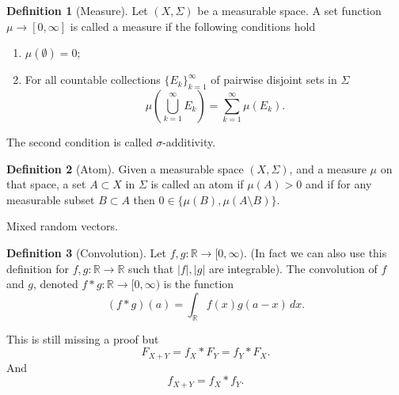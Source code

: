 \documentclass[11pt,a4paper]{article}
\theoremstyle{definition}
\newtheorem{definition}{Definition}[section]
\theoremstyle{plain}
\newcommand{\R}{\mathbb{R}}
\newcommand{\abs}[1]{\left\lvert #1\right\rvert}
\begin{document}
  \begin{definition}[Measure]
    Let $(X, \Sigma)$ be a measurable space.
    A set function $\mu \to [0,\infty]$ is called a measure if the following
    conditions hold
    \begin{enumerate}
      \item $\mu(\emptyset) = 0$;
      \item For all countable collections $\{E_{k}\}_{k=1}^{\infty }$ of
            pairwise disjoint sets in $\Sigma$
            \[ \mu \left(\bigcup _{k=1}^{\infty }E_{k}\right) =
               \sum _{k=1}^{\infty }\mu (E_{k}). \]
    \end{enumerate}
    The second condition is called $\sigma$-additivity.
  \end{definition}
  \begin{definition}[Atom]
    Given a measurable space $(X, \Sigma)$, and a measure $\mu$ on that
    space, a set $A \subset X$ in $\Sigma$ is called an atom if
    $\mu (A)>0$ and if for any measurable subset $B \subset A$ then
    $0\in \{\mu (B),\mu (A\setminus B)\}.$
  \end{definition}
  
  Mixed random vectors.

  \begin{definition}[Convolution]
    Let $f,g \colon \R \to [0,\infty)$. (In fact we can also use this 
    definition for $f,g \colon \R \to \R$ such that $\abs{f},\abs{g}$
    are integrable). The convolution of $f$ and $g$, denoted
    $f * g \colon \R \to [0,\infty)$ is the function
    \[
      (f * g)(a) = \int_{\R}f(x)g(a-x)\,dx.
    \]
  \end{definition}
  This is still missing a proof but
  \[
    F_{X+Y} = f_X * F_Y = f_Y * F_X.
  \]
  And
  \[
    f_{X+Y} = f_X * f_Y.
  \]

  \newpage
\end{document}
